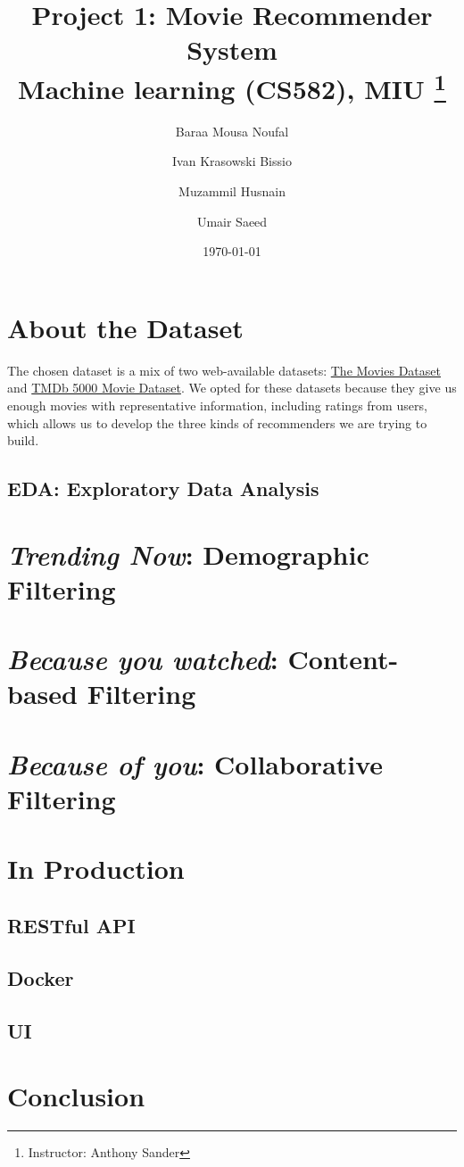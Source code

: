 \documentclass[titlepage, 11pt]{article}
\title{
	\textbf{Project 1: Movie Recommender System} \\
	Machine learning (CS582), MIU \thanks{Instructor: Anthony Sander}
}
\author{
    Baraa Mousa Noufal \and Ivan Krasowski Bissio
        \and Muzammil Husnain \and Umair Saeed
}
\date{\today}
\begin{document}
\maketitle
\tableofcontents

\begin{abstract}
	
\end{abstract}

\section{About the Dataset}
The chosen dataset is a mix of two web-available datasets:
\href{https://www.kaggle.com/rounakbanik/the-movies-dataset}{The Movies Dataset}
and \href{https://www.kaggle.com/tmdb/tmdb-movie-metadata}{TMDb 5000 Movie Dataset}.
We opted for these datasets because they give us enough movies with representative information, including ratings from users,
which allows us to develop the three kinds of recommenders we are trying to build.

\subsection{EDA: Exploratory Data Analysis}


\section{\emph{Trending Now}: Demographic Filtering}


\section{\emph{Because you watched}: Content-based Filtering}


\section{\emph{Because of you}: Collaborative Filtering}


\section{In Production}
\subsection{RESTful API}

\subsection{Docker}

\subsection{UI}

\clearpage
\section{Conclusion}

\end{document}
